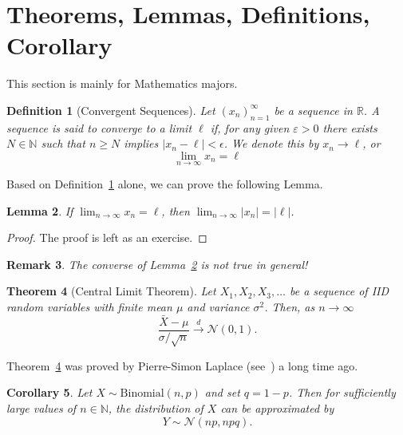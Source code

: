 \documentclass{article}
\newtheorem{definition}{Definition}[section]
\newtheorem{theorem}[definition]{Theorem}
\newtheorem{lemma}[definition]{Lemma}
\newtheorem{corollary}[definition]{Corollary}
\newtheorem{remark}[definition]{Remark}
\begin{document}
    \section{Theorems, Lemmas, Definitions, Corollary}
        This section is mainly for Mathematics majors.
        \begin{definition}[Convergent Sequences]\label{definition: convergent sequences}
            Let $(x_{n})_{n=1}^{\infty}$ be a sequence in $\mathbb{R}$. A sequence is said to converge to a limit $\ell$ if, for any given $\varepsilon > 0$ there exists $N \in \mathbb{N}$ such that $n \geq N$ implies $|x_{n} - \ell| < \epsilon$. We denote this by $x_{n} \to \ell$, or
            \begin{equation}
                \lim_{n\to\infty} x_{n} = \ell
            \end{equation}
        \end{definition}
        Based on Definition~\ref{definition: convergent sequences} alone, we can prove the following Lemma.
        \begin{lemma}\label{lemma: property of convergent sequences}
            If $\lim_{n\to\infty} x_{n} = \ell$, then $\lim_{n\to\infty} |x_{n}| = |\ell|$.
        \end{lemma}
        \begin{proof}
            The proof is left as an exercise.
        \end{proof}
        \begin{remark}
            The converse of Lemma~\ref{lemma: property of convergent sequences} is not true in general!
        \end{remark}
        \begin{theorem}[Central Limit Theorem]\label{theorem: central limit theorem}
            Let $X_{1}, X_{2}, X_{3}, \dots$ be a sequence of IID random variables with finite mean $\mu$ and variance $\sigma^{2}$. Then, as $n \to \infty$
            \begin{equation}
                \frac{\bar{X} - \mu}{\sigma/\sqrt{n}} \overset{d}{\longrightarrow} \mathcal{N}(0, 1).
            \end{equation}
        \end{theorem}
        Theorem~\ref{theorem: central limit theorem} was proved by Pierre-Simon Laplace (see~\cite{pierre-simon-laplace-clt}) a long time ago.
        \begin{corollary}
            Let $X \sim \text{Binomial}(n, p)$ and set $q = 1-p$. Then for sufficiently large values of $n \in \mathbb{N}$, the distribution of $X$ can be approximated by
            \begin{equation}
                Y \sim \mathcal{N}(np, npq).
            \end{equation}
        \end{corollary}
    \newpage
\end{document}
